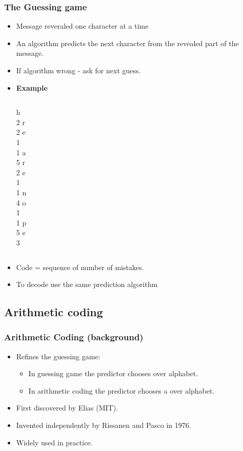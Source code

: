 \documentclass{beamer}
\begin{document}
\begin{frame}
\frametitle{The Guessing game}
\begin{itemize}
\item
Message reveraled one character at a time
\item
An algorithm predicts the next character from the revealed part of the message.
\item
If algorithm wrong - ask for next guess.
\item
{\bf Example} 
\begin{columns}
\column[t]{0.1cm} h \\ 2 
\column[t]{0.1cm} r \\ 2 
\column[t]{0.1cm} e \\ 1 
\column[t]{0.1cm}   \\ 1 
\column[t]{0.1cm} a \\ 5 
\column[t]{0.1cm} r \\ 2 
\column[t]{0.1cm} e \\ 1 
\column[t]{0.1cm}   \\ 1 
\column[t]{0.1cm} n \\ 4 
\column[t]{0.1cm} o \\ 1 
\column[t]{0.1cm}   \\ 1 
\column[t]{0.1cm} p \\ 5 
\column[t]{0.1cm} e \\ 3 
\end{columns}
\item
Code = sequence of number of mistakes.
\item
To decode use the same prediction algorithm
\end{itemize}

\end{frame}

\subsection{Arithmetic coding}

\begin{frame}
\frametitle{Arithmetic Coding (background)}
\begin{itemize}
\item Refines the guessing game:
\begin{itemize}
\item In guessing game the predictor chooses  over alphabet.
\item In arithmetic coding the predictor chooses a  over alphabet.
\end{itemize}
\item First discovered by Elias (MIT).
\item Invented independently by Rissanen and Pasco in 1976.
\item Widely used in practice.
\end{itemize}
\end{frame}
\end{document}
